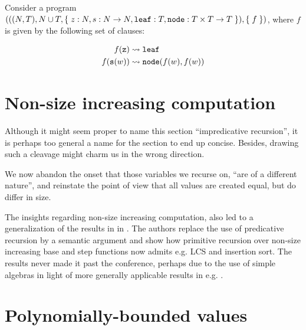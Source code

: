 \begin{example} \cite{dal-lago-et-al-2003} Consider a program ${\mathopen{}\left({{\mathopen{}\left({{\mathopen{}\left({N,T}\right)\mathclose{}}, N
\cup T, \mathopen{}\left\{\mathrel{}{z : N, s : N \rightarrow N, \mathtt{leaf} : T, \mathtt{node} : T
\times T \rightarrow T}\mathrel{}\right\}\mathclose{}}\right)\mathclose{}}, \mathopen{}\left\{\mathrel{}{f}\mathrel{}\right\}\mathclose{}}\right)\mathclose{}}$, where $f$ is given by the following set of
clauses:

\begin{align}
f{\mathopen{}\left({\mathtt{z}}\right)\mathclose{}}       &\leadsto \mathtt{leaf} \\
f{\mathopen{}\left({\mathtt{s}{\mathopen{}\left({w}\right)\mathclose{}}}\right)\mathclose{}}  &\leadsto \mathtt{node}{\mathopen{}\left({f{\mathopen{}\left({w}\right)\mathclose{}}, f{\mathopen{}\left({w}\right)\mathclose{}}}\right)\mathclose{}}
\end{align}

\end{example}

\section{Non-size increasing computation}

Although it might seem proper to name this section ``impredicative recursion'',
it is perhaps too general a name for the section to end up concise. Besides,
drawing such a cleavage might charm us in the wrong direction.

We now abandon the onset that those variables we recurse on, ``are of a
different nature'', and reinstate the point of view that all values are created
equal, but do differ in size.

The insights regarding non-size increasing computation, also led to a
generalization of the results in \cite{marion-2003} in
\cite{marion-moyen-2000}. The authors replace the use of predicative recursion
by a semantic argument and show how primitive recursion over non-size
increasing base and step functions now admits e.g. LCS and insertion sort. The
results never made it past the conference, perhaps due to the use of simple
algebras in light of more generally applicable results in e.g.
\cite{aehlig-schwichtenberg-2002, hofmann-2003}.

\section{Polynomially-bounded values}
